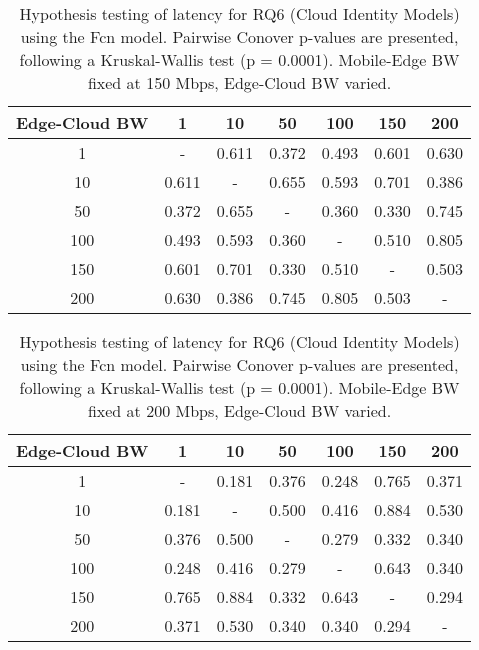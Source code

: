 \begin{table}[H]
\caption{Hypothesis testing of latency for RQ6 (Cloud Identity Models) using the Fcn model. Pairwise Conover p-values are presented, following a Kruskal-Wallis test (p = 0.0001). Mobile-Edge BW fixed at 150 Mbps, Edge-Cloud BW varied.}
\centering
\begin{tabular}{c|cccccc}
Edge-Cloud BW & 1 & 10 & 50 & 100 & 150 & 200 \\
\hline
1 & - & 0.611 & 0.372 & 0.493 & 0.601 & 0.630 \\
10 & 0.611 & - & 0.655 & 0.593 & 0.701 & 0.386 \\
50 & 0.372 & 0.655 & - & 0.360 & 0.330 & 0.745 \\
100 & 0.493 & 0.593 & 0.360 & - & 0.510 & 0.805 \\
150 & 0.601 & 0.701 & 0.330 & 0.510 & - & 0.503 \\
200 & 0.630 & 0.386 & 0.745 & 0.805 & 0.503 & - \\
\end{tabular}
\end{table}

\begin{table}[H]
\caption{Hypothesis testing of latency for RQ6 (Cloud Identity Models) using the Fcn model. Pairwise Conover p-values are presented, following a Kruskal-Wallis test (p = 0.0001). Mobile-Edge BW fixed at 200 Mbps, Edge-Cloud BW varied.}
\centering
\begin{tabular}{c|cccccc}
Edge-Cloud BW & 1 & 10 & 50 & 100 & 150 & 200 \\
\hline
1 & - & 0.181 & 0.376 & 0.248 & 0.765 & 0.371 \\
10 & 0.181 & - & 0.500 & 0.416 & 0.884 & 0.530 \\
50 & 0.376 & 0.500 & - & 0.279 & 0.332 & 0.340 \\
100 & 0.248 & 0.416 & 0.279 & - & 0.643 & 0.340 \\
150 & 0.765 & 0.884 & 0.332 & 0.643 & - & 0.294 \\
200 & 0.371 & 0.530 & 0.340 & 0.340 & 0.294 & - \\
\end{tabular}
\end{table}

